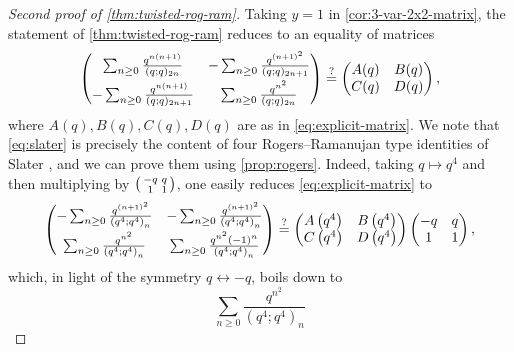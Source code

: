 \documentclass[reqno,11pt]{amsart}
\theoremstyle{definition}
\theoremstyle{remark}
\numberwithin{equation}{section}
\newenvironment{psmall}
  {\left(\begin{smallmatrix}}
  {\end{smallmatrix}\right)}
\begin{document}
\begin{proof}[Second proof of \cref{thm:twisted-rog-ram}]
Taking $y = 1$ in \cref{cor:3-var-2x2-matrix}, the statement of \cref{thm:twisted-rog-ram} reduces to an equality of matrices
\begin{equation}\label{eq:slater}
    \begin{pmatrix}
    \sum_{n \ge 0} \frac{q^{n(n+1)}}{(q; q)_{2n}}
    & 
    - \sum_{n \ge 0} \frac{q^{(n+1)^2}}{(q; q)_{2n+1}}
    \vspace{0.1cm} \\
    -\sum_{n \ge 0} \frac{q^{n(n+1)}}{(q; q)_{2n+1}}
    &
    \sum_{n \ge 0} \frac{q^{n^2}}{(q; q)_{2n}}
    \end{pmatrix}
    \stackrel{?}{=}
    \begin{pmatrix}
    A(q) & B(q) \\
    C(q) & D(q)
    \end{pmatrix},
\end{equation}
where $A(q), B(q), C(q), D(q)$ are as in \cref{eq:explicit-matrix}. We note that \cref{eq:slater} is precisely the content of four Rogers--Ramanujan type identities of Slater \cite[(94),(96),(98),(99)]{slater1952further}, and we can prove them using \cref{prop:rogers}. Indeed, taking $q \mapsto q^4$ and then multiplying by $\begin{psmall}
    -q & q \\
    1 & 1
\end{psmall}$, one easily reduces \cref{eq:explicit-matrix} to
\[
    \begin{pmatrix}
    -\sum_{n \ge 0} \frac{q^{(n+1)^2}}{\left(q^4; q^4\right)_n}
    & 
    -\sum_{n \ge 0} \frac{q^{(n+1)^2}}{\left(q^4; q^4\right)_n}
    \vspace{0.1cm} \\
    \sum_{n \ge 0} \frac{q^{n^2}}{\left(q^4; q^4\right)_n}
    &
    \sum_{n \ge 0} \frac{q^{n^2}(-1)^n}{\left(q^4; q^4\right)_n}
    \end{pmatrix}
    \stackrel{?}{=}
    \begin{pmatrix}
    A\left(q^4\right) & B\left(q^4\right) \\
    C\left(q^4\right) & D\left(q^4\right)
    \end{pmatrix}
    \begin{pmatrix}
    -q & q \\
    1 & 1
    \end{pmatrix},
\]
which, in light of the symmetry $q \leftrightarrow -q$, boils down to
\[
    \sum_{n \ge 0} \frac{q^{n^2}}{\left(q^4; q^4\right)_n}
\]
\end{proof}
\end{document}
